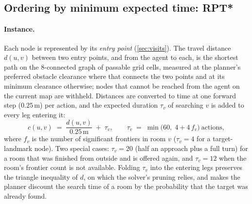 \documentclass[10pt]{article}
\newcommand{\m}{\,\mathrm{m}}
\begin{document}
\subsection{Ordering by minimum expected time: RPT*}\label{sec:rpt}
\paragraph{Instance.} Each node is represented by its \emph{entry point}
(\cref{sec:visits}). The travel distance $d(u,v)$ between two entry points, and
from the agent to each, is the shortest path on the 8-connected graph of
passable grid cells, measured at the planner's preferred obstacle clearance
where that connects the two points and at its minimum clearance otherwise;
nodes that cannot be reached from the agent on the current map are withheld.
Distances are converted to time at one forward step ($0.25\m$) per action, and
the expected duration $\tau_v$ of searching $v$ is added to every leg entering
it:
\begin{equation}\label{eq:cost}
  c(u,v) \;=\; \frac{d(u,v)}{0.25\m} \;+\; \tau_v,
  \qquad
  \tau_v \;=\; \min\bigl(60,\; 4 + 4\,f_v\bigr)\ \text{actions},
\end{equation}
where $f_v$ is the number of significant frontiers in room $v$ ($\tau_v=4$ for
a target-landmark node). Two special cases: $\tau_v=20$ (half an approach plus
a full turn) for a room that was finished from outside and is offered again,
and $\tau_v=12$ when the room's frontier count is not available. Folding
$\tau_v$ into the entering legs preserves the triangle inequality of $d$, on
which the solver's pruning relies, and makes the planner discount the search time of a room by the
probability that the target was already found.
\end{document}
